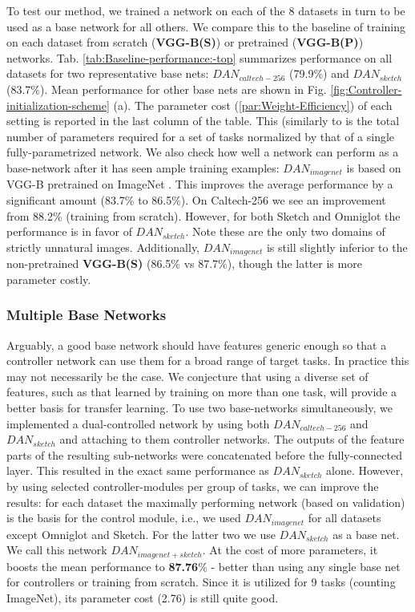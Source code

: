 \documentclass[10pt,journal,compsoc]{IEEEtran}
\makeatletter
\newcommand{\ie}{i.e.\@\xspace}
\makeatother
\begin{document}
To test our method, we trained a network on each of the 8 datasets
in turn to be used as a base network for all others. We compare this
to the baseline of training on each dataset from scratch (\textbf{VGG-B(S)})
or pretrained (\textbf{VGG-B(P)}) networks. Tab. \ref{tab:Baseline-performance:-top}
summarizes performance on all datasets for two representative base
nets: $DAN_{caltech-256}$ (79.9\%) and $DAN_{sketch}$ (83.7\%).
Mean performance for other base nets are shown in Fig. \ref{fig:Controller-initialization-scheme}
(a). The parameter cost (\ref{par:Weight-Efficiency}) of each setting
is reported in the last column of the table. This (similarly to \cite{rebuffi2017learning}
is the total number of parameters required for a set of tasks normalized
by that of a single fully-parametrized network. We also check how
well a network can perform as a base-network after it has seen ample
training examples: $DAN_{imagenet}$ is based on VGG-B pretrained
on ImageNet \cite{russakovsky2015imagenet}. This improves the average
performance by a significant amount (83.7\% to 86.5\%). On Caltech-256
we see an improvement from 88.2\% (training from scratch). However,
for both Sketch and Omniglot the performance is in favor of $DAN_{sketch}$.
Note these are the only two domains of strictly unnatural images.
Additionally, $DAN_{imagenet}$ is still slightly inferior to the
non-pretrained \textbf{VGG-B(S)} (86.5\% vs 87.7\%), though the latter
is more parameter costly. 

\subsubsection{Multiple Base Networks}

Arguably, a good base network should have features generic enough
so that a controller network can use them for a broad range of target
tasks. In practice this may not necessarily be the case. We conjecture
that using a diverse set of features, such as that learned by training
on more than one task, will provide a better basis for transfer learning.
To use two base-networks simultaneously, we implemented a dual-controlled
network by using both $DAN_{caltech-256}$ and $DAN_{sketch}$ and
attaching to them controller networks. The outputs of the feature
parts of the resulting sub-networks were concatenated before the fully-connected
layer. This resulted in the exact same performance as $DAN_{sketch}$
alone. However, by using selected controller-modules per group of
tasks, we can improve the results: for each dataset the maximally
performing network (based on validation) is the basis for the control
module, \ie, we used $DAN_{imagenet}$ for all datasets except Omniglot
and Sketch. For the latter two we use $DAN_{sketch}$ as a base net.
We call this network $DAN_{imagenet+sketch}$. At the cost of more
parameters, it boosts the mean performance to \textbf{87.76}\% - better
than using any single base net for controllers or training from scratch.
Since it is utilized for 9 tasks (counting ImageNet), its parameter
cost (2.76) is still quite good.
\end{document}
